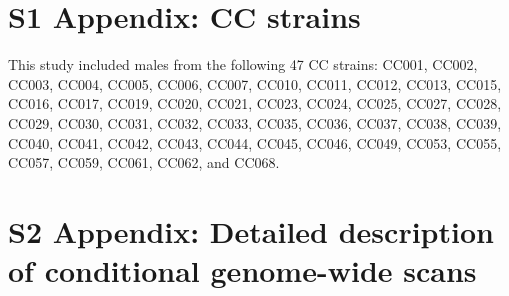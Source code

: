 \documentclass[10pt,letterpaper,twoside]{article}
\begin{document}
\section*{S1 Appendix: CC strains}

This study included males from the following 47 CC strains: CC001, CC002, CC003, CC004, CC005, CC006, CC007, CC010, CC011, CC012, CC013, CC015, CC016, CC017, CC019, CC020, CC021, CC023, CC024, CC025, CC027, CC028, CC029, CC030, CC031, CC032, CC033, CC035, CC036, CC037, CC038, CC039, CC040, CC041, CC042, CC043, CC044, CC045, CC046, CC049, CC053, CC055, CC057, CC059, CC061, CC062, and CC068.

\newpage

\section*{S2 Appendix: Detailed description of conditional genome-wide scans}
\end{document}
